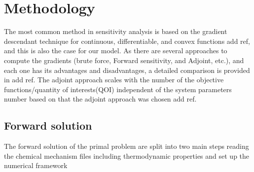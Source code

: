 \documentclass[preprint,review,12pt]{elsarticle}
\begin{document}
\section{Methodology}
\label{Methodology}
The most common method in sensitivity analysis is based on the gradient descendant technique for continuous, differentiable, and convex functions {\color{red} add ref}, and this is also the case for our model.
 As there are several approaches to compute the gradients (brute force, Forward sensitivity, and Adjoint, etc.), and each one has its advantages and disadvantages, a detailed comparison is provided in  {\color{red} add ref}. The adjoint approach scales with the number of the objective functions/quantity of interests(QOI) independent of the system parameters number based on that the adjoint approach was chosen{\color{red} add ref}.  
\subsection{Forward solution}
The forward solution of the primal problem  are split into two main steps reading the chemical mechanism files including thermodynamic properties and set up the numerical framework    	
\end{document}
